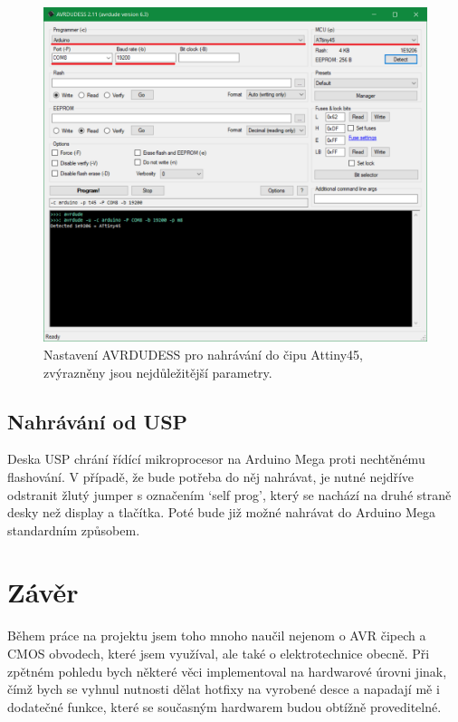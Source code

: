 \documentclass[11pt,a4paper,twoside,openright]{report}
\begin{document}
\begin{figure}[ht!]
  \includegraphics[width=\linewidth]{img/avrdude.png}
  \centering
  \caption{Nastavení AVRDUDESS pro nahrávání do čipu Attiny45, zvýrazněny jsou nejdůležitější parametry.}
  \label{fig:avrdude}
\end{figure}

\section {Nahrávání od USP \label{selfupload}}

Deska USP chrání řídící mikroprocesor na Arduino Mega proti nechtěnému flashování. V případě, že bude potřeba do něj nahrávat, je nutné nejdříve odstranit žlutý jumper s označením \lq self prog\rq , který se nachází na druhé straně desky než display a tlačítka. Poté bude již možné nahrávat do Arduino Mega standardním způsobem.

\chapter*{Závěr}
\pagestyle{empty}

Během práce na projektu jsem toho mnoho naučil nejenom o AVR čipech a CMOS obvodech, které jsem využíval, ale také o elektrotechnice obecně. Při zpětném pohledu bych některé věci implementoval na hardwarové úrovni jinak, čímž bych se vyhnul nutnosti dělat hotfixy na vyrobené desce a napadají mě i dodatečné funkce, které se současným hardwarem budou obtížně proveditelné.
\end{document}

